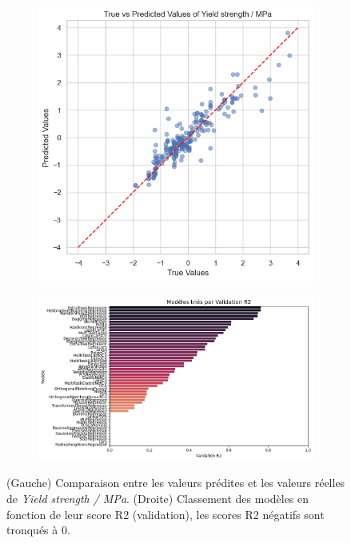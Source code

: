 \documentclass{article}
\begin{document}
\begin{figure}[H]
    \centering
    \begin{subfigure}[b]{0.40\textwidth}
        \centering
        \includegraphics[width=\textwidth]{images/predictions_vs_true.png}
        \label{fig:predictions_vs_true}
    \end{subfigure}
    \hfill
    \begin{subfigure}[b]{0.55\textwidth}
        \centering
        \includegraphics[width=\textwidth, height=0.25\textheight]{images/model_R2_results.png}
        \label{fig:second_image}
    \end{subfigure}
    \caption{(Gauche) Comparaison entre les valeurs prédites et les valeurs réelles de \textit{Yield strength / MPa}. (Droite) Classement des modèles en fonction de leur score R2 (validation), les scores R2 négatifs sont tronqués à 0.}
    \label{fig:side_by_side}
\end{figure}
\end{document}

